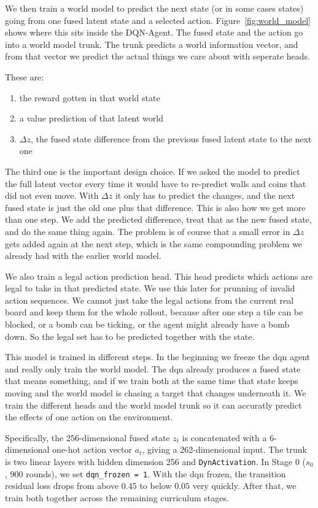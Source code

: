 We then train a world model to predict the next state (or in some cases states) going from one fused latent state and a selected action. Figure~\ref{fig:world_model} shows where this sits inside the DQN-Agent. The fused state and the action go into a world model trunk. The trunk predicts a world information vector, and from that vector we predict the actual things we care about with seperate heads.

These are:
\begin{enumerate}
    \item the reward gotten in that world state
    \item a value prediction of that latent world
    \item $\Delta z$, the fused state difference from the previous fused latent state to the next one
\end{enumerate}

The third one is the important design choice. If we asked the model to predict the full latent vector every time it would have to re-predict walls and coins that did not even move. With $\Delta z$ it only has to predict the changes, and the next fused state is just the old one plus that difference. This is also how we get more than one step. We add the predicted difference, treat that as the new fused state, and do the same thing again. The problem is of course that a small error in $\Delta z$ gets added again at the next step, which is the same compounding problem we already had with the earlier world model.

We also train a legal action prediction head. This head predicts which actions are legal to take in that predicted state. We use this later for prunning of invalid action sequences. We cannot just take the legal actions from the current real board and keep them for the whole rollout, because after one step a tile can be blocked, or a bomb can be ticking, or the agent might already have a bomb down. So the legal set has to be predicted together with the state.

This model is trained in different steps. In the beginning we freeze the dqn agent and really only train the world model. The dqn already produces a fused state that means something, and if we train both at the same time that state keeps moving and the world model is chasing a target that changes underneath it. We train the different heads and the world model trunk so it can accuratly predict the effects of one action on the environment.

Specifically, the 256-dimensional fused state $z_t$ is concatenated with a 6-dimensional one-hot action vector $a_t$, giving a 262-dimensional input. The trunk is two linear layers with hidden dimension 256 and \texttt{DynActivation}. In Stage 0 ($s_0$, 900 rounds), we set \texttt{dqn\_frozen = 1}. With the dqn frozen, the transition residual loss drops from above $0.45$ to below $0.05$ very quickly. After that, we train both together across the remaining curriculum stages.

